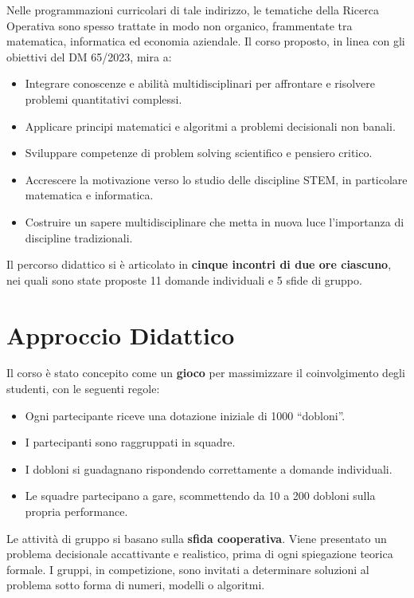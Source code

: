 \documentclass[withtimes]{easychair}
\begin{document}
Nelle programmazioni curricolari di tale indirizzo, le tematiche della
Ricerca Operativa sono spesso trattate in modo non organico, frammentate
tra matematica, informatica ed economia aziendale. Il corso proposto, in
linea con gli obiettivi del DM 65/2023, mira a:

\begin{itemize}
\tightlist
\item
  Integrare conoscenze e abilità multidisciplinari per affrontare e
  risolvere problemi quantitativi complessi.
\item
  Applicare principi matematici e algoritmi a problemi decisionali non
  banali.
\item
  Sviluppare competenze di problem solving scientifico e pensiero
  critico.
\item
  Accrescere la motivazione verso lo studio delle discipline STEM, in
  particolare matematica e informatica.
\item
  Costruire un sapere multidisciplinare che metta in nuova luce
  l'importanza di discipline tradizionali.
\end{itemize}

Il percorso didattico si è articolato in \textbf{cinque incontri di due
ore ciascuno}, nei quali sono state proposte 11 domande individuali e 5
sfide di gruppo.

\section{Approccio Didattico}\label{approccio-didattico}

Il corso è stato concepito come un \textbf{gioco} per massimizzare il
coinvolgimento degli studenti, con le seguenti regole:

\begin{itemize}
\tightlist
\item
  Ogni partecipante riceve una dotazione iniziale di 1000 ``dobloni''.
\item
  I partecipanti sono raggruppati in squadre.
\item
  I dobloni si guadagnano rispondendo correttamente a domande
  individuali.
\item
  Le squadre partecipano a gare, scommettendo da 10 a 200 dobloni sulla
  propria performance.
\end{itemize}

Le attività di gruppo si basano sulla \textbf{sfida cooperativa}. Viene
presentato un problema decisionale accattivante e realistico, prima di
ogni spiegazione teorica formale. I gruppi, in competizione, sono
invitati a determinare soluzioni al problema sotto forma di numeri,
modelli o algoritmi.
\end{document}
